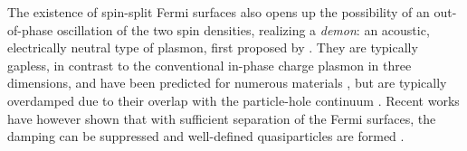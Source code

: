 \documentclass[aps,prl,reprint,twocolumns,superscriptaddress]{revtex4-2}
\begin{document}
	The existence of spin-split Fermi surfaces also opens up the possibility of an out-of-phase oscillation of the two spin densities, realizing a \emph{demon}: an acoustic, electrically neutral type of plasmon, first proposed by \textcite{pinesElectronInteractionSolids1956,husainPinesDemonObserved2023}. They are typically gapless, in contrast to the conventional in-phase charge plasmon in three dimensions, and have  been predicted for numerous materials \cite{pinesElectronInteractionSolids1956,ruvaldsAreThereAcoustic1981}, but are typically overdamped due to their overlap with the particle-hole continuum \cite{dassarmaCollectiveModesSpatially1981, sensarmaDynamicScreeningLowenergy2010,agarwalLonglivedSpinPlasmons2014,sadhukhanNovelUndampedGapless2020}. Recent works have however shown that with sufficient separation of the Fermi surfaces, the damping can be suppressed and well-defined quasiparticles are formed \cite{agarwalLonglivedSpinPlasmons2014,husainPinesDemonObserved2023}.
	
\end{document}
